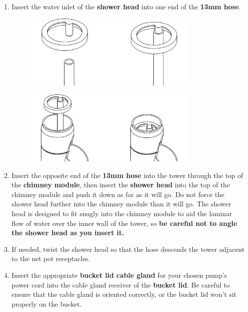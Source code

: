 \begin{enumerate}
\item Insert the water inlet of the \textbf{shower head} into one end of the \textbf{13mm hose}.

\begin{figure}[h!]
    \centering
    \includegraphics[width=0.8\textwidth]{images/80mm/80mm_assembly_5.png}
    \caption*{}
    \label{fig:80mm-five}
\end{figure}
\begin{figure}[h!]
    \centering
    \includegraphics[width=0.8\textwidth]{images/80mm/80mm_assembly_6.png}
    \caption*{}
    \label{fig:80mm-six}
\end{figure}

\item Insert the opposite end of the \textbf{13mm hose} into the tower through the top of the \textbf{chimney module}, then insert the \textbf{shower head} into the top of the chimney module and push it down as far as it will go. Do not force the shower head further into the chimney module than it will go. The shower head is designed to fit snugly into the chimney module to aid the laminar flow of water over the inner wall of the tower, so \textbf{be careful not to angle the shower head as you insert it.}

\item If needed, twist the shower head so that the hose descends the tower adjacent to the net pot receptacles.

\item Insert the appropriate \textbf{bucket lid cable gland} for your chosen pump's power cord into the cable gland receiver of the \textbf{bucket lid}. Be careful to ensure that the cable gland is oriented correctly, or the bucket lid won't sit properly on the bucket.


\end{enumerate}
